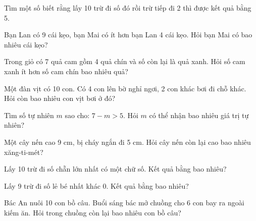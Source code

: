 \begin{ex}
Tìm một số biết rằng lấy 10 trừ đi số đó rồi trừ tiếp đi 2 thì được kết quả bằng 5.
\end{ex}

\begin{ex}
Bạn Lan có 9 cái kẹo, bạn Mai có ít hơn bạn Lan 4 cái kẹo. Hỏi bạn Mai có bao nhiêu cái kẹo?
\end{ex}

\begin{ex}
Trong giỏ có 7 quả cam gồm 4 quả chín và số còn lại là quả xanh. Hỏi số cam xanh ít hơn số cam chín bao nhiêu quả?
\end{ex}

\begin{ex}
Một đàn vịt có 10 con. Có 4 con lên bờ nghỉ ngơi, 2 con khác bơi đi chỗ khác. Hỏi còn bao nhiêu con vịt bơi ở đó?
\end{ex}

\begin{ex}
Tìm số tự nhiên $m$ sao cho: $7 - m > 5$. Hỏi $m$ có thể nhận bao nhiêu giá trị tự nhiên?
\end{ex}

\begin{ex}
Một cây nến cao 9 cm, bị cháy ngắn đi 5 cm. Hỏi cây nến còn lại cao bao nhiêu xăng-ti-mét?
\end{ex}

\begin{ex}
Lấy 10 trừ đi số chẵn lớn nhất có một chữ số. Kết quả bằng bao nhiêu?
\end{ex}

\begin{ex}
Lấy 9 trừ đi số lẻ bé nhất khác 0. Kết quả bằng bao nhiêu?
\end{ex}

\begin{ex}
Bác An nuôi 10 con bồ câu. Buổi sáng bác mở chuồng cho 6 con bay ra ngoài kiếm ăn. Hỏi trong chuồng còn lại bao nhiêu con bồ câu?
\end{ex}
